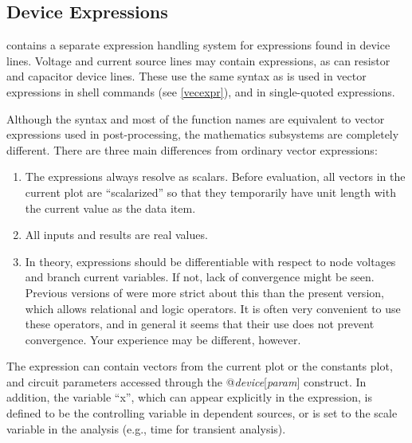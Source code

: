 \subsection{Device Expressions}
\label{devexpr}


{\WRspice} contains a separate expression handling system for
expressions found in device lines.  Voltage and current source lines
may contain expressions, as can resistor and capacitor device lines. 
These use the same syntax as is used in vector expressions in
{\WRspice} shell commands (see \ref{vecexpr}), and in single-quoted
expressions.

Although the syntax and most of the function names are equivalent to
vector expressions used in post-processing, the mathematics subsystems
are completely different.  There are three main differences from
ordinary vector expressions:

\begin{enumerate}
\item{The expressions always resolve as scalars.  Before evaluation,
all vectors in the current plot are ``scalarized'' so that they temporarily
have unit length with the current value as the data item.}

\item{All inputs and results are real values.}

\item{In theory, expressions should be differentiable with respect to
node voltages and branch current variables.  If not, lack of
convergence might be seen.  Previous versions of {\WRspice} were more
strict about this than the present version, which allows relational
and logic operators.  It is often very convenient to use these
operators, and in general it seems that their use does not prevent
convergence.  Your experience may be different, however.}
\end{enumerate}

The expression can contain vectors from the current plot
or the {\vt constants} plot, and circuit parameters accessed through
the {\vt @{\it device\/}[{\it param\/}]} construct.  In addition, the
variable ``{\vt x}'', which can appear explicitly in the expression,
is defined to be the controlling variable in dependent sources, or is
set to the scale variable in the analysis (e.g., {\et time} for
transient analysis).


